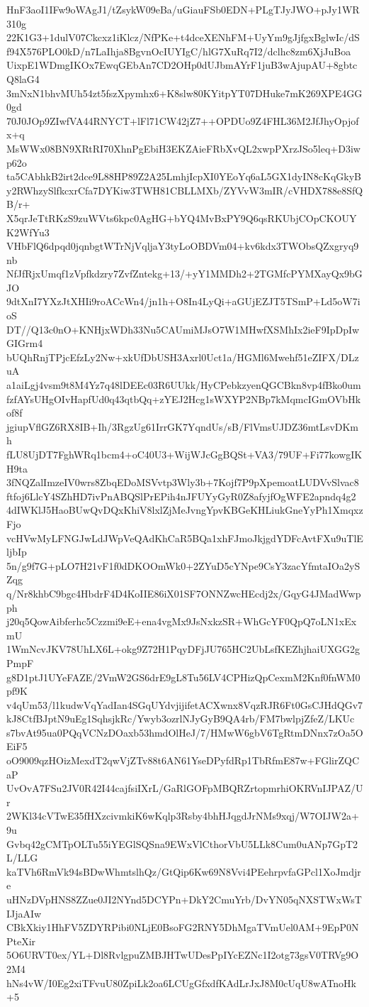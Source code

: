 HnF3aoI1IFw9oWAgJ1/tZsykW09eBa/uGiauFSb0EDN+PLgTJyJWO+pJy1WR310g
22K1G3+1dulV07Ckcxz1iKlcz/NfPKe+t4dceXENhFM+UyYm9gJjfgxBglwIc/dS
f94X576PLO0kD/n7LaIhja8BgvnOcIUYIgC/hlG7XuRq7I2/dclhc8zm6XjJuBoa
UixpE1WDmgIKOx7EwqGEbAn7CD2OHp0dUJbmAYrF1juB3wAjupAU+8gbtcQ8laG4
3mNxN1bhvMUh54zt5fszXpymhx6+K8slw80KYitpYT07DHuke7mK269XPE4GG0gd
70J0JOp9ZIwfVA44RNYCT+lFl71CW42jZ7++OPDUo9Z4FHL36M2JfJhyOpjofx+q
MsWWx08BN9XRtRI70XhnPgEbiH3EKZAieFRbXvQL2xwpPXrzJSo5leq+D3iwp62o
ta5CAbhkB2irt2dce9L88HP89Z2A25LmhjIcpXI0YEoYq6aL5GX1dyIN8cKqGkyB
y2RWhzySlfkcxrCfa7DYKiw3TWH81CBLLMXb/ZYVvW3mIR/cVHDX788e8SfQB/r+
X5qrJeTtRKzS9zuWVts6kpc0AgHG+bYQ4MvBxPY9Q6qsRKUbjCOpCKOUYK2WfYu3
VHbFlQ6dpqd0jqnbgtWTrNjVqljaY3tyLoOBDVm04+kv6kdx3TWObsQZxgryq9nb
NfJfRjxUmqf1zVpfkdzry7ZvfZntekg+13/+yY1MMDh2+2TGMfcPYMXayQx9bGJO
9dtXnI7YXzJtXHIi9roACcWn4/jn1h+O8In4LyQi+aGUjEZJT5TSmP+Ld5oW7ioS
DT//Q13c0nO+KNHjxWDh33Nu5CAUmiMJsO7W1MHwfXSMhIx2ieF9IpDpIwGIGrm4
bUQhRnjTPjcEfzLy2Nw+xkUfDbUSH3Axrl0Uct1a/HGMl6Mwehf51eZIFX/DLzuA
a1aiLgj4vsm9t8M4Yz7q48lDEEc03R6UUkk/HyCPebkzyenQGCBkn8vp4fBko0um
fzfAYsUHgOIvHapfUd0q43qtbQq+zYEJ2Hcg1sWXYP2NBp7kMqmcIGmOVbHkof8f
jgiupVflGZ6RX8IB+Ih/3RgzUg61IrrGK7YqndUs/sB/FlVmsUJDZ36mtLsvDKmh
fLU8UjDT7FghWRq1bcm4+oC40U3+WijWJcGgBQSt+VA3/79UF+Fi77kowgIKH9ta
3fNQZalImzeIV0wrs8ZbqEDoMSVvtp3Wly3b+7Kojf7P9pXpemoatLUDVvSlvac8
ftfoj6LlcY4SZhHD7ivPnABQSlPrEPih4nJFUYyGyR0Z8afyjfOgWFE2apndq4g2
4dIWKlJ5HaoBUwQvDQxKhiV8lxlZjMeJvngYpvKBGeKHLiukGneYyPh1XmqxzFjo
vcHVwMyLFNGJwLdJWpVeQAdKhCaR5BQa1xhFJmoJkjgdYDFcAvtFXu9uTlEljbIp
5n/g9f7G+pLO7H21vF1f0dDKOOmWk0+2ZYuD5cYNpe9CsY3zacYfmtaIOa2ySZqg
q/Nr8khbC9bgc4HbdrF4D4KoIIE86iX01SF7ONNZwcHEcdj2x/GqyG4JMadWwpph
j20q5QowAibferhc5Czzmi9eE+ena4vgMx9JsNxkzSR+WhGcYF0QpQ7oLN1xExmU
1WmNcvJKV78UhLX6L+okg9Z72H1PqyDFjJU765HC2UbLsfKEZhjhaiUXGG2gPmpF
g8D1ptJ1UYeFAZE/2VmW2GS6drE9gL8Tu56LV4CPHizQpCexmM2Knf0fnWM0pf9K
v4qUm53/l1kudwVqYadIan4SGqUYdvjijifetACXwnx8VqzRJR6Ft0GsCJHdQGv7
kJ8CtfBJptN9uEg1SqhsjkRc/Ywyb3ozrlNJyGyB9QA4rb/FM7bwlpjZfeZ/LKUc
s7bvAt95ua0PQqVCNzDOaxb53hmdOlHeJ/7/HMwW6gbV6TgRtmDNnx7zOa5OEiF5
oO9009qzHOizMexdT2qwVjZTv88t6AN61YseDPyfdRp1TbRfmE87w+FGlirZQCaP
UvOvA7FSu2JV0R42I44cajfsiIXrL/GaRlGOFpMBQRZrtopmrhiOKRVnIJPAZ/Ur
2WKl34cVTwE35fHXzcivmkiK6wKqlp3Rsby4bhHJqgdJrNMs9xqj/W7OIJW2a+9u
Gvbq42gCMTpOLTu55iYEGlSQSna9EWxVlCthorVbU5LLk8Cum0uANp7GpT2L/LLG
kaTVh6RmVk94sBDwWhmtslhQz/GtQip6Kw69N8Vvi4PEehrpvfaGPcl1XoJmdjre
uHNzDVpHNS8ZZue0JI2NYnd5DCYPn+DkY2CmuYrb/DvYN05qNXSTWxWsTIJjaAIw
CBkXkiy1HhFV5ZDYRPibi0NLjE0BsoFG2RNY5DhMgaTVmUel0AM+9EpP0NPteXir
5O6URVT0ex/YL+Dl8RvlgpuZMBJHTwUDesPpIYcEZNc1I2otg73gsV0TRVg9O2M4
hNs4vW/I0Eg2xiTFvuU80ZpiLk2oa6LCUgGfxdfKAdLrJxJ8M0cUqU8wATnoHk+5
